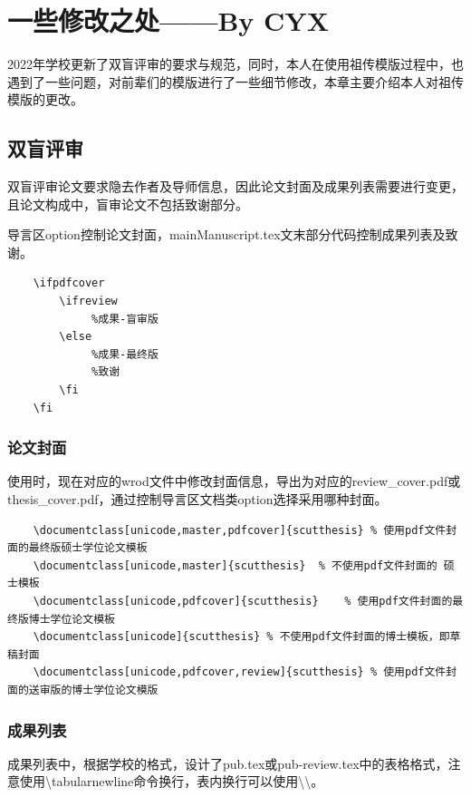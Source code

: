 \chapter{一些修改之处——By CYX}
2022年学校更新了双盲评审的要求与规范，同时，本人在使用祖传模版过程中，也遇到了一些问题，对前辈们的模版进行了一些细节修改，本章主要介绍本人对祖传模版的更改。

\section{双盲评审}
双盲评审论文要求隐去作者及导师信息，因此论文封面及成果列表需要进行变更，且论文构成中，盲审论文不包括致谢部分。

导言区option控制论文封面，mainManuscript.tex文末部分代码控制成果列表及致谢。
\begin{lstlisting}
    \ifpdfcover
        \ifreview
             %成果-盲审版
        \else
             %成果-最终版
             %致谢
        \fi
    \fi
\end{lstlisting}
\subsection{论文封面}
使用时，现在对应的wrod文件中修改封面信息，导出为对应的review\_cover.pdf或thesis\_cover.pdf，通过控制导言区文档类option选择采用哪种封面。
\begin{lstlisting}
    \documentclass[unicode,master,pdfcover]{scutthesis}	% 使用pdf文件封面的最终版硕士学位论文模板
    \documentclass[unicode,master]{scutthesis}	% 不使用pdf文件封面的 硕士模板
    \documentclass[unicode,pdfcover]{scutthesis}	% 使用pdf文件封面的最终版博士学位论文模板
    \documentclass[unicode]{scutthesis}	% 不使用pdf文件封面的博士模板，即草稿封面
    \documentclass[unicode,pdfcover,review]{scutthesis}	% 使用pdf文件封面的送审版的博士学位论文模版
\end{lstlisting}
\subsection{成果列表}
成果列表中，根据学校的格式，设计了pub.tex或pub-review.tex中的表格格式，注意使用\textbackslash{}tabularnewline命令换行，表内换行可以使用\textbackslash{}\textbackslash{}。

